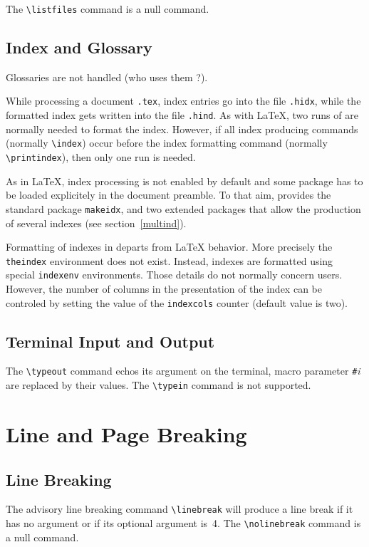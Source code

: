 The \verb+\listfiles+ command is a null command.


\subsection{Index and Glossary}\label{index}
Glossaries are not handled (who uses them ?).

While processing a document \texttt{.tex}, index
entries go into the file \texttt{.hidx}, while
the formatted index gets written into the file
\texttt{.hind}.
As with \LaTeX{}, two runs of \hevea{} are normally needed to format
the index.
However, if all index producing commands (normally \verb+\index+)
occur before the index formatting command (normally
\verb+\printindex+), then only one run is needed.

As in \LaTeX, index processing is not enabled by default and
some  package has to be loaded explicitely in the
document preamble.
To that aim, \hevea{} provides the standard package \texttt{makeidx},
and two extended packages that allow the production of several indexes
(see section~\ref{multind}).

Formatting of indexes in \hevea{} departs from \LaTeX{} behavior.
More precisely the \verb+theindex+ environment does not exist.
Instead, indexes are formatted using special
\texttt{indexenv} environments.
Those details do not normally concern users.
However, the
number of columns in the presentation  of the index can be controled
by setting the value of the \texttt{indexcols} counter (default value
is two).

\subsection{Terminal Input and Output}

The \verb+\typeout+ command echos its argument on the
terminal, macro parameter \verb+#+\textit{i} are replaced by their values.
The \verb+\typein+ command is not supported.

\section{Line and Page Breaking}

\subsection{Line Breaking}
The advisory line breaking command \verb+\linebreak+
will produce a line break if it has no argument or if its optional
argument is~4.
The \verb+\nolinebreak+ command is a null command.


